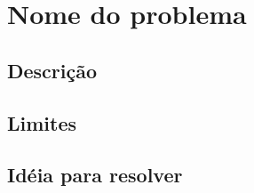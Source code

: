 \section*{Nome do problema}

\subsection*{Descrição}

\subsection*{Limites}

\subsection*{Idéia para resolver}
